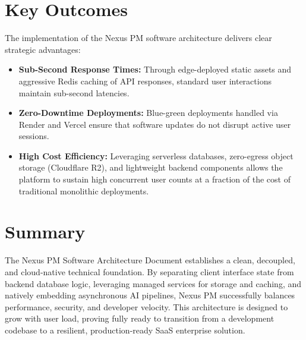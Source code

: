 \section{Key Outcomes}
The implementation of the Nexus PM software architecture delivers clear strategic advantages:
\begin{itemize}
    \item \textbf{Sub-Second Response Times:} Through edge-deployed static assets and aggressive Redis caching of API responses, standard user interactions maintain sub-second latencies.
    \item \textbf{Zero-Downtime Deployments:} Blue-green deployments handled via Render and Vercel ensure that software updates do not disrupt active user sessions.
    \item \textbf{High Cost Efficiency:} Leveraging serverless databases, zero-egress object storage (Cloudflare R2), and lightweight backend components allows the platform to sustain high concurrent user counts at a fraction of the cost of traditional monolithic deployments.
\end{itemize}

\section{Summary}
The Nexus PM Software Architecture Document establishes a clean, decoupled, and cloud-native technical foundation. By separating client interface state from backend database logic, leveraging managed services for storage and caching, and natively embedding asynchronous AI pipelines, Nexus PM successfully balances performance, security, and developer velocity. This architecture is designed to grow with user load, proving fully ready to transition from a development codebase to a resilient, production-ready SaaS enterprise solution.
